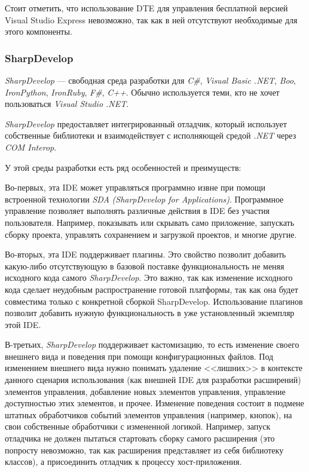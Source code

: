 Стоит отметить, что использование DTE для управления бесплатной версией Visual Studio Express невозможно, так как в ней отсутствуют необходимые для этого компоненты.

\subsubsection{SharpDevelop}

{\it SharpDevelop} --- свободная среда разработки для {\it C\#}, {\it Visual Basic .NET}, {\it Boo}, {\it IronPython}, {\it IronRuby}, {\it F\#}, {\it C++}. Обычно используется теми, кто не хочет пользоваться {\it Visual Studio .NET}.

{\it SharpDevelop} предоставляет интегрированный отладчик, который использует собственные библиотеки и взаимодействует с исполняющей средой {\it .NET} через {\it COM Interop}.

У этой среды разработки есть ряд особенностей и преимуществ:

Во-первых, эта IDE может управляться программно извне при помощи встроенной технологии {\it SDA} {\it (SharpDevelop for Applications)}. Программное управление позволяет выполнять различные действия в IDE без участия пользователя. Например, показывать или скрывать само приложение, запускать сборку проекта, управлять сохранением и загрузкой проектов, и многие другие. 

Во-вторых, эта IDE поддерживает плагины. Это свойство позволит добавить какую-либо отсутствующую в базовой поставке функциональность не меняя исходного кода самого {\it SharpDevelop}. Это важно, так как изменение исходного кода сделает неудобным распространение готовой платформы, так как она будет совместима только с конкретной сборкой SharpDevelop. Использование плагинов позволит добавить нужную функциональность в уже установленный экземпляр этой IDE.

В-третьих, {\it SharpDevelop} поддерживает кастомизацию, то есть изменение своего внешнего вида и поведения при помощи конфигурационных файлов. Под изменением внешнего вида нужно понимать удаление <<лишних>> в контексте данного сценария использования (как внешней IDE для разработки расширений) элементов управления, добавление новых элементов управления, управление доступностью этих элементов, и прочее. Изменение поведения состоит в подмене штатных обработчиков событий элементов управления (например, кнопок), на свои собственные обработчики с измененной логикой. Например, запуск отладчика не должен пытаться стартовать сборку самого расширения (это попросту невозможно, так как расширения представляет из себя библиотеку классов), а присоединить отладчик к процессу хост-приложения.


